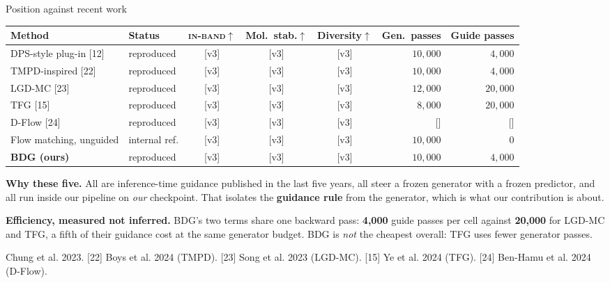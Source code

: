 \documentclass[aspectratio=169,10pt]{beamer}
\newcommand{\theslidelabel}{}
\newcommand{\lbl}[1]{\renewcommand{\theslidelabel}{#1}}
\newcommand{\srcs}[1]{\vfill{\raggedleft\color{grayt}\fontsize{4.9}{5.6}\selectfont #1\par}}
\newcommand{\TODO}[1]{\textcolor{accent}{\scriptsize[#1]}}
\newcommand{\ib}{\textsc{in-band}}
\begin{document}
\lbl{2e}
\begin{frame}{Position against recent work}
  \centering
  {\small
  \begin{tabular}{llcccrr}
    \toprule
    Method & Status & \ib$\uparrow$ & Mol.\ stab.$\uparrow$ & Diversity$\uparrow$ & Gen.\ passes & Guide passes \\
    \midrule
    DPS-style plug-in [12] & reproduced & \TODO{v3} & \TODO{v3} & \TODO{v3} & $10{,}000$ & $4{,}000$ \\
    TMPD-inspired [22] & reproduced & \TODO{v3} & \TODO{v3} & \TODO{v3} & $10{,}000$ & $4{,}000$ \\
    LGD-MC [23] & reproduced & \TODO{v3} & \TODO{v3} & \TODO{v3} & $12{,}000$ & $20{,}000$ \\
    TFG [15] & reproduced & \TODO{v3} & \TODO{v3} & \TODO{v3} & $8{,}000$ & $20{,}000$ \\
    D-Flow [24] & reproduced & \TODO{v3} & \TODO{v3} & \TODO{v3} & \TODO{} & \TODO{} \\
    \midrule
    Flow matching, unguided & internal ref. & \TODO{v3} & \TODO{v3} & \TODO{v3} & $10{,}000$ & $0$ \\
    \textbf{BDG (ours)} & reproduced & \TODO{v3} & \TODO{v3} & \TODO{v3} & $10{,}000$ & $4{,}000$ \\
    \bottomrule
  \end{tabular}}

  \smallskip
  \raggedright
  \textbf{Why these five.} All are inference-time guidance published in the last five
  years, all steer a frozen generator with a frozen predictor, and all run inside our
  pipeline on \emph{our} checkpoint. That isolates the \textbf{guidance rule} from the
  generator, which is what our contribution is about.

  \smallskip
  \textbf{Efficiency, measured not inferred.} BDG's two terms share one backward
  pass: \textbf{4{,}000} guide passes per cell against \textbf{20{,}000} for LGD-MC
  and TFG, a fifth of their guidance cost at the same generator budget. BDG is
  \emph{not} the cheapest overall: TFG uses fewer generator passes.

  \srcs{[12] Chung et al. 2023. [22] Boys et al. 2024 (TMPD).
        [23] Song et al. 2023 (LGD-MC). [15] Ye et al. 2024 (TFG).
        [24] Ben-Hamu et al. 2024 (D-Flow).}
\end{frame}
\end{document}
